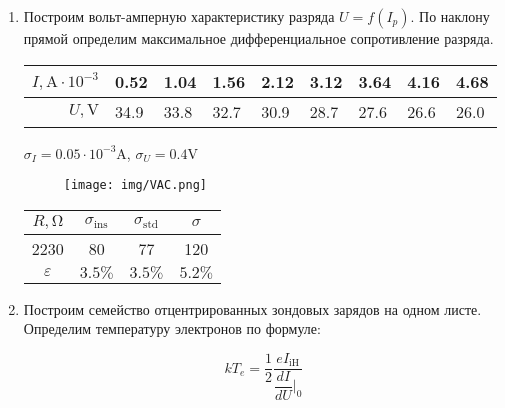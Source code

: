 \documentclass[12pt]{article}
\begin{document}
\begin{enumerate}
	\item Построим вольт-амперную характеристику разряда $U = f(I_p)$. По наклону прямой определим максимальное дифференциальное сопротивление разряда.
	
	\begin{tabular}{|r|l|l|l|l|l|l|l|l|}
	\hline
	$I, \si{\ampere} \cdot 10^{-3}$ & 0.52 & 1.04 & 1.56 & 2.12 & 3.12 & 3.64 & 4.16 & 4.68 \\ \hline
	$U, \si{\volt}$ & 34.9 & 33.8 & 32.7 & 30.9 & 28.7 & 27.6 & 26.6 & 26.0 \\
	    \hline
	\end{tabular}
	$\sigma_I = 0.05 \cdot 10^{-3} \si{\ampere}$, $\sigma_U = 0.4 \si{\volt}$
	
	\begin{figure}[htb]
	    \centering
	    \texttt{[image: img/VAC.png]}
	    \label{fig:VAC}
	\end{figure}
	
	\begin{tabular}{|c|c|c|c|}
	\hline
	     $R, \si{\ohm}$ & $\sigma_{\text{ins}}$ & $\sigma_{\text{std}}$ & $\sigma$ \\ \hline
	     2230 & 80 & 77 & 120 \\ \hline
	     $\varepsilon$ & $3.5\%$ & $3.5\%$ & $5.2\%$ \\ \hline
	\end{tabular}
	\newpage
	
	\item Построим семейство отцентрированных зондовых зарядов на одном листе. Определим температуру электронов по формуле:
	
	\begin{equation}
	    k T_e = \dfrac{1}{2} \dfrac{e I_{\text{iH}}}{\dfrac{d I}{d U }\Bigr|_0}
	\end{equation}
	

\end{enumerate}
\end{document}
